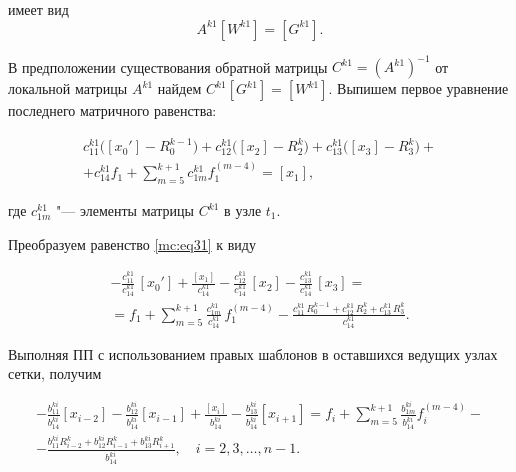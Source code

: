 имеет вид $$A^{k1}[W^{k1}]=[G^{k1}].$$



В предположении существования обратной матрицы  $C^{k1}=(A^{k1})^{-1}$ от локальной матрицы $A^{k1}$ найдем $C^{k1}[G^{k1}]=[W^{k1}]$. Выпишем первое уравнение последнего матричного равенства:

\begin{multline}

\label{mc:eq31}

c_{11}^{k1}\bigl([x_{0}']-R_{0}^{k-1}\bigr)+c_{12}^{k1}\bigl([x_{2}]-R_{2}^k\bigr)+

c_{13}^{k1}\bigl([x_{3}]-R_{3}^k\bigr)+

\\

+c_{14}^{k1}f_{1}+\sum_{m=5}^{k+1}c_{1m}^{k1} f_1^{(m-4)}=[x_1],

\end{multline}

где $c_{1m}^{k1}$ "--- элементы матрицы $   C^{k1}$ в узле $t_1$.



Преобразуем равенство \eqref{mc:eq31} к виду

\begin{multline}

\label{mc:eq32}

-

\frac{c_{11}^{k1}}{c_{14}^{k1}}\,[x_{0}']+\frac{[x_1]}{c_{14}^{k1}}-\frac{c_{12}^{k1}}{c_{14}^{k1}}\,[x_{2}]-\frac{c_{13}^{k1}}{c_{14}^{k1}}\,[x_{3}]

=\\

=f_{1}+\sum_{m=5}^{k+1}\frac{c_{1m}^{k1}}{c_{14}^{k1}}\,f_1^{(m-4)}-

\frac{c_{11}^{k1}\,R_{0}^{k-1}+c_{12}^{k1}\,R_{2}^k+c_{13}^{k1}\,R_{3}^k}{c_{14}^{k1}}.

\end{multline}

Выполняя  ПП с использованием правых шаблонов в оставшихся ведущих узлах сетки, получим

\begin{multline}

\label{mc:eq33}  

-\frac{b_{11}^{ki}}{b_{14}^{ki}} [x_{i-2}]-\frac{b_{12}^{ki}}{b_{14}^{ki}} [x_{i-1}]+\frac{[x_i]}{b_{14}^{ki}}-\frac{b_{13}^{ki}}{b_{14}^{ki}} [x_{i+1}]


=f_{i}+\sum_{m=5}^{k+1}\frac{b_{1m}^{ki}}{b_{14}^{ki}} f_i^{(m-4)}-

\\

-

\frac{b_{11}^{ki} R_{i-2}^k+b_{12}^{ki} R_{i-1}^k+b_{13}^{ki} R_{i+1}^k}{b_{14}^{ki}}

,\quad i=2,  3,  \dots,  n-1.

\end{multline}





